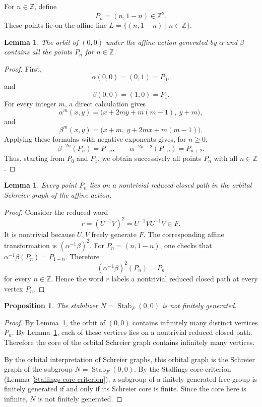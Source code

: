 \documentclass[]{amsart}
\newtheorem*{fixed point criterion}{\fixed point criterion}
\newtheorem{lem}[thm]{Lemma}
\newtheorem{prop}[thm]{Proposition}
\theoremstyle{definition}
\theoremstyle{remark}
\numberwithin{equation}{section}
\newcommand{\Z}{\mathbb Z}
\newcommand{\Stab}{\operatorname{Stab}}
\begin{document}
For $n\in \Z$, define
\begin{equation}\label{eq. Pn}
   P_n=(n,1-n)\in \Z^2. 
\end{equation}
These points lie on the affine line $L=\{(n,1-n)\mid n\in \Z\}.$

\begin{lem}\label{lem:orbit-infinitely-many}
The orbit of $(0,0)$ under the affine action generated by $\alpha$ and $\beta$
contains all the points $P_n$ for $n\in \Z$.
\end{lem}

\begin{proof}
First,
\[
    \alpha(0,0)=(0,1)=P_0,
\]
and
\[
    \beta(0,0)=(1,0)=P_1.
\]
For every integer $m$, a direct calculation gives
\[
    \alpha^m(x,y)=\bigl(x+2my+m(m-1),\ y+m\bigr),
\]
and
\[
    \beta^m(x,y)=\bigl(x+m,\ y+2mx+m(m-1)\bigr).
\]
Applying these formulas with negative exponents gives, for $n\geq 0$,
\[
\beta^{-2n}(P_n)=P_{-n},
\qquad
\alpha^{-2n-2}(P_{-n})=P_{n+2}.
\]
Thus, starting from $P_0$ and $P_1$, we obtain successively all points
$P_n$ with all $n\in \Z$.
\end{proof}

\begin{lem}\label{lem:loops}
Every point $P_n$ lies on a nontrivial reduced closed path in the orbital
Schreier graph of the affine action.
\end{lem}

\begin{proof}
Consider the reduced word
\[
    r=(U^{-1}V)^2=U^{-1}VU^{-1}V\in F.
\]
It is nontrivial because $U,V$ freely generate $F$.  The corresponding affine
transformation is $(\alpha^{-1}\beta)^2$.
For $P_n=(n,1-n)$, one checks that
$\alpha^{-1}\beta(P_n)=P_{1-n}.$
Therefore
\[
    (\alpha^{-1}\beta)^2(P_n)=P_n
\]
for every $n\in \Z$.  Hence the word $r$ labels a nontrivial reduced closed
path at every vertex $P_n$.
\end{proof}

\begin{prop}\label{prop:N-not-fg}
The stabilizer $N=\Stab_F(0,0)$ is not finitely generated.
\end{prop}

\begin{proof}
By Lemma~\ref{lem:orbit-infinitely-many}, the orbit of $(0,0)$ contains infinitely
many distinct vertices $P_n$.  By Lemma~\ref{lem:loops}, each of these vertices lies
on a nontrivial reduced closed path.  Therefore the core of the orbital
Schreier graph contains infinitely many vertices.

By the orbital interpretation of Schreier graphs, this orbital graph is the
Schreier graph of the subgroup $N=\Stab_F(0,0)$.  By the Stallings core
criterion (Lemma \ref{Stallings core criterion}), a subgroup of a finitely generated free group is finitely generated
if and only if its Schreier core is finite.  Since the core here is infinite,
$N$ is not finitely generated.
\end{proof}
\end{document}
